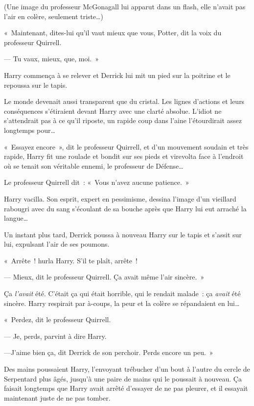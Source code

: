 (Une image du professeur McGonagall lui apparut dans un flash, elle n'avait pas l'air en colère, seulement triste…)

«~Maintenant, dites-lui qu'il vaut mieux que vous, Potter, dit la voix du professeur Quirrell.

--- Tu vaux, mieux, que, moi.~»

Harry commença à se relever et Derrick lui mit un pied sur la poitrine et le repoussa sur le tapis.

Le monde devenait aussi transparent que du cristal.
Les lignes d'actions et leurs conséquences s'étiraient devant Harry avec une clarté absolue.
L'idiot ne s'attendrait pas à ce qu'il riposte, un rapide coup dans l'aine l'étourdirait assez longtemps pour…

«~Essayez encore~», dit le professeur Quirrell, et d'un mouvement soudain et très rapide, Harry fit une roulade et bondit sur ses pieds et virevolta face à l'endroit où se tenait son véritable ennemi, le professeur de Défense…

Le professeur Quirrell dit~: «~Vous n'avez aucune patience.~»

Harry vacilla.
Son esprit, expert en pessimisme, dessina l'image d'un vieillard rabougri avec du sang s'écoulant de sa bouche après que Harry lui eut arraché la langue…

Un instant plus tard, Derrick poussa à nouveau Harry sur le tapis et s'assit sur lui, expulsant l'air de ses poumons.

«~Arrête~! hurla Harry.
S'il te plaît, arrête~!

--- Mieux, dit le professeur Quirrell.
Ça avait même l'air sincère.~»

Ça \emph{l'avait} été.
C'était ça qui était horrible, qui le rendait malade~: ça \emph{avait} été sincère.
Harry respirait par à-coups, la peur et la colère se répandaient en lui…

«~Perdez, dit le professeur Quirrell.

--- Je, perds, parvint à dire Harry.

---J'aime bien ça, dit Derrick de son perchoir.
Perds encore un peu.~»

\later

Des mains poussaient Harry, l'envoyant trébucher d'un bout à l'autre du cercle de Serpentard plus âgés, jusqu'à une paire de mains qui le poussait à nouveau.
Ça faisait longtemps que Harry avait arrêté d'essayer de ne pas pleurer, et il essayait maintenant juste de ne pas tomber.

